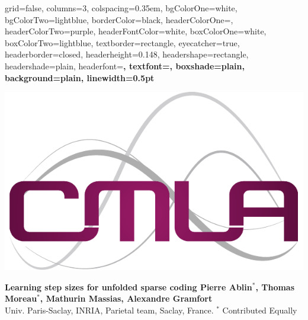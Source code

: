 \documentclass[landscape,a0paper,fontscale=0.265]{baposter} %
\begin{document}
\begin{poster}%
  {
  grid=false,
  columns=3,
  colspacing=0.35em,
  bgColorOne=white,
  bgColorTwo=lightblue,
  borderColor=black,
  headerColorOne=\maincolor,
  headerColorTwo=purple,
  headerFontColor=white,
  boxColorOne=white,
  boxColorTwo=lightblue,
  textborder=rectangle,
  eyecatcher=true,
  headerborder=closed,
  headerheight=0.148\textheight,
  headershape=rectangle,
  headershade=plain,
  headerfont=\Large\fontfamily{\sfdefault}\bfseries, %
  textfont={\setlength{\parindent}{1.5em}},
  boxshade=plain,
  background=plain,
  linewidth=0.5pt
  }
  {
  \begin{minipage}{.17\linewidth}
    \centering
    \includegraphics[width=0.6\linewidth]{logo_cmla}
  \end{minipage}
  }
  {\huge\fontfamily{\sfdefault}\bfseries {
    Learning step sizes for unfolded sparse coding
  }
    \vspace{.7em}
  }
  {\Large  {\textbf
    {
      Pierre Ablin$^{*}$, \hspace{5pt}
      Thomas Moreau$^{*}$, \hspace{5pt}
      Mathurin Massias, \hspace{5pt}
      Alexandre Gramfort}}\\
       \vspace{5pt}
   \normalsize{
   Univ. Paris-Saclay, INRIA, Parietal team, Saclay, France.
   $^*$ Contributed Equally
   \\}
   \vspace{-10pt}
  }
  {%
}
\end{poster}
\end{document}
